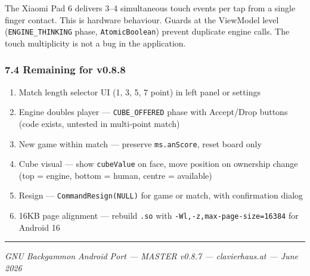 \documentclass[11pt,a4paper]{article}
\providecommand{\tightlist}{\setlength{\itemsep}{2pt}\setlength{\parskip}{0pt}}
\begin{document}
The Xiaomi Pad 6 delivers 3--4 simultaneous touch events per tap from
a single finger contact. This is hardware behaviour. Guards at the
ViewModel level (\texttt{ENGINE\_THINKING} phase, \texttt{AtomicBoolean})
prevent duplicate engine calls. The touch multiplicity is not a bug in
the application.

\subsubsection{7.4 Remaining for v0.8.8}\label{next-v087}

\begin{enumerate}
\def\labelenumi{\arabic{enumi}.}
\tightlist
\item
  Match length selector UI (1, 3, 5, 7 point) in left panel or settings
\item
  Engine doubles player --- \texttt{CUBE\_OFFERED} phase with Accept/Drop
  buttons (code exists, untested in multi-point match)
\item
  New game within match --- preserve \texttt{ms.anScore}, reset board only
\item
  Cube visual --- show \texttt{cubeValue} on face, move position on
  ownership change (top = engine, bottom = human, centre = available)
\item
  Resign --- \texttt{CommandResign(NULL)} for game or match, with
  confirmation dialog
\item
  16KB page alignment --- rebuild \texttt{.so} with
  \texttt{-Wl,-z,max-page-size=16384} for Android 16
\end{enumerate}

\begin{center}\rule{0.5\linewidth}{0.5pt}\end{center}
\emph{GNU Backgammon Android Port --- MASTER v0.8.7 --- clavierhaus.at
--- June 2026}
\end{document}

